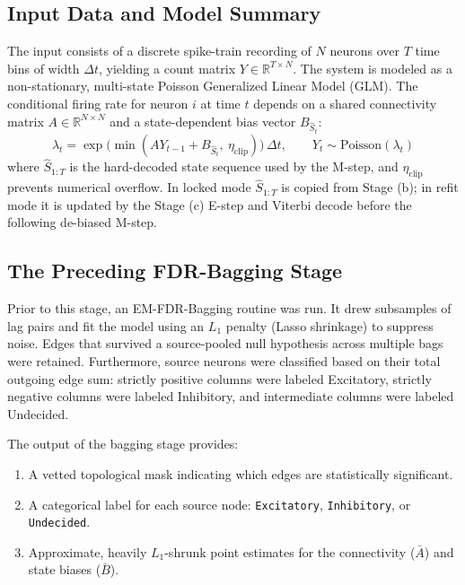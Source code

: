 \documentclass[11pt]{article}
\begin{document}
\subsection{Input Data and Model Summary}
The input consists of a discrete spike-train recording of $N$ neurons over $T$ time bins of width $\Delta t$, yielding a count matrix $Y \in \mathbb{R}^{T \times N}$. The system is modeled as a non-stationary, multi-state Poisson Generalized Linear Model (GLM). The conditional firing rate for neuron $i$ at time $t$ depends on a shared connectivity matrix $A \in \mathbb{R}^{N \times N}$ and a state-dependent bias vector $B_{\hat{S}_t}$:
\begin{equation}
\label{eq:model-rate}
\lambda_t = \exp\big(\min(A Y_{t-1} + B_{\hat{S}_t},\ \eta_{\text{clip}})\big)\,\Delta t, \qquad Y_t \sim \text{Poisson}(\lambda_t)
\end{equation}
where $\hat{S}_{1:T}$ is the hard-decoded state sequence used by the M-step, and $\eta_{\text{clip}}$ prevents numerical overflow. In locked mode $\hat{S}_{1:T}$ is copied from Stage (b); in refit mode it is updated by the Stage (c) E-step and Viterbi decode before the following de-biased M-step.

\subsection{The Preceding FDR-Bagging Stage}
Prior to this stage, an EM-FDR-Bagging routine was run. It drew subsamples of lag pairs and fit the model using an $L_1$ penalty (Lasso shrinkage) to suppress noise. Edges that survived a source-pooled null hypothesis across multiple bags were retained. Furthermore, source neurons were classified based on their total outgoing edge sum: strictly positive columns were labeled Excitatory, strictly negative columns were labeled Inhibitory, and intermediate columns were labeled Undecided.

The output of the bagging stage provides:
\begin{enumerate}
    \item A vetted topological mask indicating which edges are statistically significant.
    \item A categorical label for each source node: \texttt{Excitatory}, \texttt{Inhibitory}, or \texttt{Undecided}.
    \item Approximate, heavily $L_1$-shrunk point estimates for the connectivity ($\bar{A}$) and state biases ($\bar{B}$).
\end{enumerate}
\end{document}
